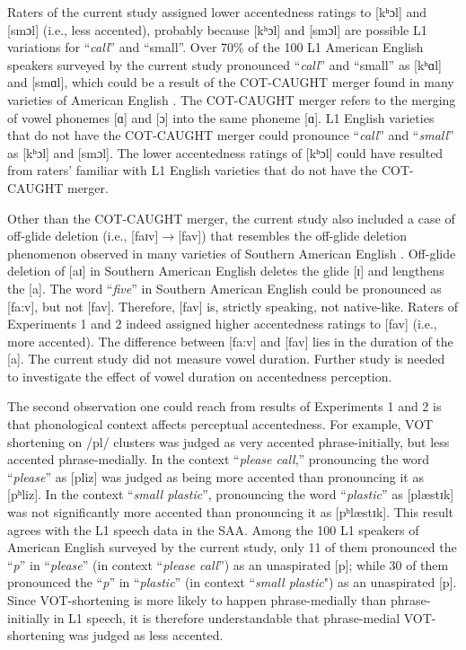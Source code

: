 Raters of the current study assigned lower accentedness ratings to [kʰɔl] and [smɔl] (i.e., less accented), probably because [kʰɔl] and [smɔl] are possible L1 variations for “\textit{call}” and “small”. Over 70\% of the 100 L1 American English speakers surveyed by the current study pronounced “\textit{call}” and “small” as [kʰɑl] and [smɑl], which could be a result of the COT-CAUGHT merger found in many varieties of American English \citep{Labov_2005}. The COT-CAUGHT merger refers to the merging of vowel phonemes [ɑ] and [ɔ] into the same phoneme [ɑ]. L1 English varieties that do not have the COT-CAUGHT merger could pronounce “\textit{call}” and “\textit{small}” as [kʰɔl] and [smɔl]. The lower accentedness ratings of [kʰɔl] could have resulted from raters' familiar with L1 English varieties that do not have the COT-CAUGHT merger. 

Other than the COT-CAUGHT merger, the current study also included a case of off-glide deletion (i.e., [faɪv]$\rightarrow$[fav]) that resembles the off-glide deletion phenomenon observed in many varieties of Southern American English \citep{Labov_2005}. Off-glide deletion of [aɪ] in Southern American English deletes the glide [ɪ] and lengthens the [a]. The word “\textit{five}” in Southern American English could be pronounced as [fa:v], but not [fav]. Therefore, [fav] is, strictly speaking, not native-like. Raters of Experiments 1 and 2 indeed assigned higher accentedness ratings to [fav] (i.e., more accented). The difference between [fa:v] and [fav] lies in the duration of the [a]. The current study did not measure vowel duration. Further study is needed to investigate the effect of vowel duration on accentedness perception. 

The second observation one could reach from results of Experiments 1 and 2 is that phonological context affects perceptual accentedness. For example, VOT shortening on /pl/ clusters was judged as very accented phrase-initially, but less accented phrase-medially. In the context “\textit{please call},” pronouncing the word “\textit{please}” as [pliz] was judged as being more accented than pronouncing it as [pʰliz]. In the context “\textit{small plastic}”, pronouncing the word “\textit{plastic}” as [plæstɪk] was not significantly more accented than pronouncing it as [pʰlæstɪk]. This result agrees with the L1 speech data in the SAA. Among the 100 L1 speakers of American English surveyed by the current study, only 11 of them pronounced the “\textit{p}” in “\textit{please}” (in context “\textit{please call}”) as an unaspirated [p]; while 30 of them pronounced the “\textit{p}” in “\textit{plastic}” (in context “\textit{small plastic}") as an unaspirated [p]. Since VOT-shortening is more likely to happen phrase-medially than phrase-initially in L1 speech, it is therefore understandable that phrase-medial VOT-shortening was judged as less accented. 

